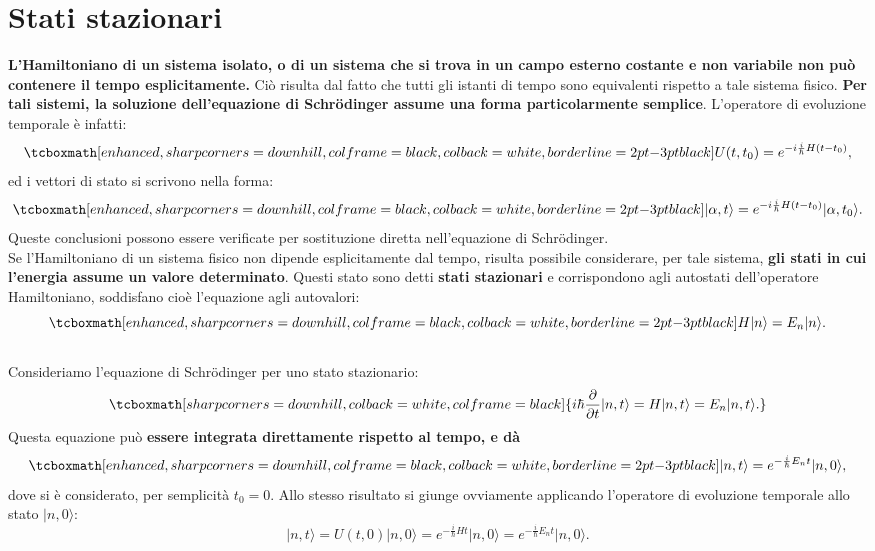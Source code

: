 \section[Stati stazionari]{Stati stazionari}
\textbf{L'Hamiltoniano di un sistema isolato, o di un sistema che si trova in un campo esterno costante e non variabile non può contenere il tempo esplicitamente.} Ciò risulta dal fatto che tutti gli istanti di tempo sono equivalenti rispetto a tale sistema fisico. \textbf{Per tali sistemi, la soluzione dell'equazione di Schr\"{o}dinger assume una forma particolarmente semplice}. L'operatore di evoluzione temporale è infatti:
	\begin{equation}
		\tcboxmath[enhanced, sharp corners=downhill, colframe=black, colback=white, borderline={2pt}{-3pt}{black}]{
		U(t,t_0)= e^{-i\frac{i}{\hbar}H(t-t_0)},
		}
	\end{equation}
ed i vettori di stato si scrivono nella forma:
	\begin{equation}
		\tcboxmath[enhanced, sharp corners=downhill, colframe=black, colback=white, borderline={2pt}{-3pt}{black}]{
			\vert \alpha, t \rangle = e^{-i\frac{i}{\hbar}H(t-t_0)}\vert \alpha, t_0 \rangle.
			}
	\end{equation}
Queste conclusioni possono essere verificate per sostituzione diretta nell'equazione di Schr\"{o}dinger.\\

Se l'Hamiltoniano di un sistema fisico non dipende esplicitamente dal tempo, risulta possibile considerare, per tale sistema, \textbf{gli stati in cui l'energia assume un valore determinato}. Questi stato sono detti \textbf{stati stazionari} e corrispondono agli autostati dell'operatore Hamiltoniano, soddisfano cioè l'equazione agli autovalori:
	\begin{equation}
		\tcboxmath[enhanced, sharp corners=downhill, colframe=black, colback=white, borderline={2pt}{-3pt}{black}]{
			H|n\rangle = E_n |n \rangle.
			}
	\end{equation}\\
	
Consideriamo l'equazione di Schr\"{o}dinger per uno stato stazionario:
	\begin{equation}
		\tcboxmath[sharp corners=downhill, colback=white, colframe=black]{
			i\hbar \frac{\partial}{\partial t}|n,t\rangle = H |n,t \rangle = E_n |n, t \rangle.
			}
	\end{equation}
Questa equazione può \textbf{essere integrata direttamente rispetto al tempo, e dà}
	\begin{equation}
		\tcboxmath[enhanced, sharp corners=downhill, colframe=black, colback=white, borderline={2pt}{-3pt}{black}]{	
			|n,t\rangle = e^{-\frac{i}{\hbar}E_n t}\vert n, 0\rangle,
			}
	\label{eq:cap8_4}
	\end{equation}
dove si è considerato, per semplicità $t_0=0$. Allo stesso risultato si giunge ovviamente applicando l'operatore di evoluzione temporale allo stato $\vert n, 0\rangle$:
	\begin{equation}
		\vert n, t \rangle = U(t,0) \vert n, 0 \rangle = e^{-\frac{i}{\hbar}H t}\vert n, 0\rangle= e^{-\frac{i}{\hbar}E_n t}\vert n, 0\rangle.
	\end{equation}\\

